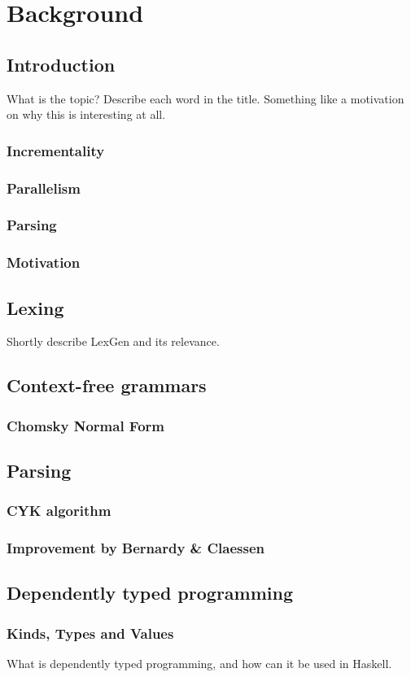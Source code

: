 \chapter{Background}

\section{Introduction}
What is the topic? Describe each word in the title. Something like a motivation on why this is interesting at all.
\subsection{Incrementality}

\subsection{Parallelism}
\subsection{Parsing}
\subsection{Motivation}

\section{Lexing}
Shortly describe LexGen and its relevance.

\section{Context-free grammars}
\subsection{Chomsky Normal Form}

\section{Parsing}
\subsection{CYK algorithm}
\subsection{Improvement by Bernardy \& Claessen}

\section{Dependently typed programming}
\subsection{Kinds, Types and Values}
What is dependently typed programming, and how can it be used in Haskell.


